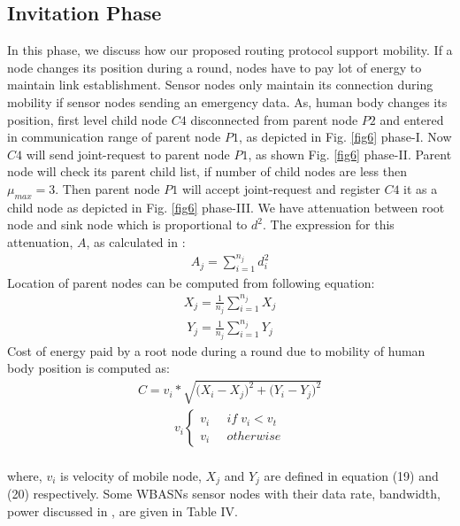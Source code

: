 \documentclass[journal]{IEEEtran}
\begin{document}
\subsection{Invitation Phase}
In this phase, we discuss how our proposed routing protocol support mobility. If a node changes its position during a round, nodes have to pay lot of energy to maintain link establishment. Sensor nodes only maintain its connection during mobility if sensor nodes sending an emergency data. As, human body changes its position, first level child node $C4$ disconnected from parent node $P2$ and entered in communication range of parent node $P1$, as depicted in Fig. \ref{fig6} phase-I. Now $C4$ will send joint-request to parent node $P1$, as shown Fig. \ref{fig6} phase-II. Parent node will check its parent child list, if number of child nodes are less then $\mu_{max}=3$. Then parent node $P1$ will accept joint-request and register $C4$ it as a child node as depicted in Fig. \ref{fig6} phase-III.
We have attenuation between root node and sink node which is proportional to $d^{2}$. The expression for this attenuation, $A$, as calculated in \cite{4726120}:
\begin{eqnarray}
A_{j}=\sum^{n_{j}}_{i=1}d^{2}_{i}
\end{eqnarray}
Location of parent nodes can be computed from following equation:
\begin{eqnarray}
X_{j}=\frac{1}{n_{j}}\sum^{n_{j}}_{i=1}X_{j}
\end{eqnarray}
\begin{eqnarray}
Y_{j}=\frac{1}{n_{j}}\sum^{n_{j}}_{i=1}Y_{j}
\end{eqnarray}
Cost of energy paid by a root node during a round due to mobility of human body position is computed as:
\begin{eqnarray}
C=v_{i}*\sqrt{(X_{i}-{X_{j})^{2}+(Y_{i}}-{Y_{j})^{2}}}
\end{eqnarray}
\begin{eqnarray}
v_{i}
\begin{cases}
v_{i}  \;\;\;\;\; if\;v_{i}<v_{t}\\
v_{i} \;\;\;\;\; otherwise
\end{cases}
\end{eqnarray}
\\
where, $v_{i}$ is velocity of mobile node, $X_{j}$ and $Y_{j}$ are defined in equation (19) and (20) respectively.
Some WBASNs sensor nodes with their data rate, bandwidth, power discussed in \cite{ullah2010comprehensive}, \cite{ latre2011survey} are given in Table IV.
\end{document}
